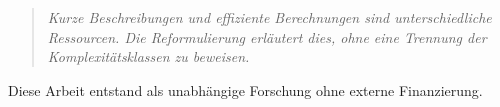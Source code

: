\documentclass[aps,prd,twocolumn,superscriptaddress,nofootinbib]{revtex4-2}
\theoremstyle{definition}
\theoremstyle{remark}
\begin{document}
\begin{quote}
\textit{Kurze Beschreibungen und effiziente Berechnungen sind
unterschiedliche Ressourcen. Die Reformulierung erläutert dies,
ohne eine Trennung der Komplexitätsklassen zu beweisen.}
\end{quote}


\begin{acknowledgments}
Diese Arbeit entstand als unabhängige Forschung ohne
externe Finanzierung.
\end{acknowledgments}




\end{document}
